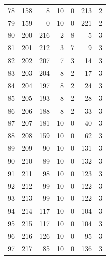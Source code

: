 \documentclass[a4paper,twoside,12pt]{book}
\begin{document}
\begin{appendices}
\begin{table}
\begin{tabular}{lrrrrrr}
		78  &    158 &         8 &        10 &               0 &             213 &         2 \\
		79  &    159 &         0 &        10 &               0 &             221 &         2 \\
		80  &    200 &       216 &         2 &               8 &               5 &         3 \\
		81  &    201 &       212 &         3 &               7 &               9 &         3 \\
		82  &    202 &       207 &         7 &               3 &              14 &         3 \\
		83  &    203 &       204 &         8 &               2 &              17 &         3 \\
		84  &    204 &       197 &         8 &               2 &              24 &         3 \\
		85  &    205 &       193 &         8 &               2 &              28 &         3 \\
		86  &    206 &       188 &         8 &               2 &              33 &         3 \\
		87  &    207 &       181 &        10 &               0 &              40 &         3 \\
		88  &    208 &       159 &        10 &               0 &              62 &         3 \\
		89  &    209 &        90 &        10 &               0 &             131 &         3 \\
		90  &    210 &        89 &        10 &               0 &             132 &         3 \\
		91  &    211 &        98 &        10 &               0 &             123 &         3 \\
		92  &    212 &        99 &        10 &               0 &             122 &         3 \\
		93  &    213 &        99 &        10 &               0 &             122 &         3 \\
		94  &    214 &       117 &        10 &               0 &             104 &         3 \\
		95  &    215 &       117 &        10 &               0 &             104 &         3 \\
		96  &    216 &       126 &        10 &               0 &              95 &         3 \\
		97  &    217 &        85 &        10 &               0 &             136 &         3 \\

\end{tabular}
\end{table}
\end{appendices}
\end{document}
